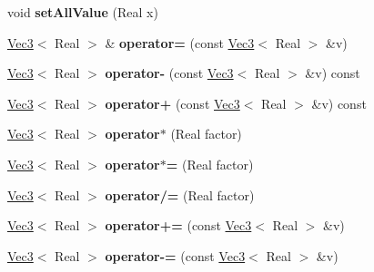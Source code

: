 \begin{DoxyCompactItemize}
\item 
\hypertarget{classVec3_a50862570291523e92e8f8c64fb284398}{void {\bfseries set\+All\+Value} (Real x)}\label{classVec3_a50862570291523e92e8f8c64fb284398}

\item 
\hypertarget{classVec3_a6c55044299e8ae76b15c887ce5c177e0}{\hyperlink{classVec3}{Vec3}$<$ Real $>$ \& {\bfseries operator=} (const \hyperlink{classVec3}{Vec3}$<$ Real $>$ \&v)}\label{classVec3_a6c55044299e8ae76b15c887ce5c177e0}

\item 
\hypertarget{classVec3_a2b38b0c073ca0b9986547b899d749f2b}{\hyperlink{classVec3}{Vec3}$<$ Real $>$ {\bfseries operator-\/} (const \hyperlink{classVec3}{Vec3}$<$ Real $>$ \&v) const }\label{classVec3_a2b38b0c073ca0b9986547b899d749f2b}

\item 
\hypertarget{classVec3_a7d8dcc983b02b0c3fee240c6d3c883b4}{\hyperlink{classVec3}{Vec3}$<$ Real $>$ {\bfseries operator+} (const \hyperlink{classVec3}{Vec3}$<$ Real $>$ \&v) const }\label{classVec3_a7d8dcc983b02b0c3fee240c6d3c883b4}

\item 
\hypertarget{classVec3_af5bc2889c47b3fcb21f1bb93591cc06d}{\hyperlink{classVec3}{Vec3}$<$ Real $>$ {\bfseries operator$\ast$} (Real factor)}\label{classVec3_af5bc2889c47b3fcb21f1bb93591cc06d}

\item 
\hypertarget{classVec3_a008bf74ce5e2560e3285fefd6b17e69d}{\hyperlink{classVec3}{Vec3}$<$ Real $>$ {\bfseries operator$\ast$=} (Real factor)}\label{classVec3_a008bf74ce5e2560e3285fefd6b17e69d}

\item 
\hypertarget{classVec3_a2ce5a6f5054142f4d19127625df97678}{\hyperlink{classVec3}{Vec3}$<$ Real $>$ {\bfseries operator/=} (Real factor)}\label{classVec3_a2ce5a6f5054142f4d19127625df97678}

\item 
\hypertarget{classVec3_a4c059f81aa6ed9139eff97875a7970a2}{\hyperlink{classVec3}{Vec3}$<$ Real $>$ {\bfseries operator+=} (const \hyperlink{classVec3}{Vec3}$<$ Real $>$ \&v)}\label{classVec3_a4c059f81aa6ed9139eff97875a7970a2}

\item 
\hypertarget{classVec3_a2a78a01c03bcc08771ff6175fd02067b}{\hyperlink{classVec3}{Vec3}$<$ Real $>$ {\bfseries operator-\/=} (const \hyperlink{classVec3}{Vec3}$<$ Real $>$ \&v)}\label{classVec3_a2a78a01c03bcc08771ff6175fd02067b}


\end{DoxyCompactItemize}
